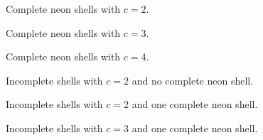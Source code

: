 \begin{figure}[h]
    \centering
    
    \caption{Complete neon shells with $c=2$.}
    \label{compl02}
\end{figure}

\begin{figure}
    \centering
    
    \caption{Complete neon shells with $c=3$.}
    \label{compl03}
\end{figure}

\begin{figure}[h]
    \centering
    
    \caption{Complete neon shells with $c=4$.}
    \label{compl04}
\end{figure}



\begin{figure}[h]
    \centering
    
    \caption{Incomplete shells with $c=2$ and no complete neon shell.}
    \label{incompl00-core02}
\end{figure}


\begin{figure}[h]
    \centering
    
    \caption{Incomplete shells with $c=2$ and one complete neon shell.}
    \label{incompl01-core02}
\end{figure}

\begin{figure}
    \centering
    
    \caption{Incomplete shells with $c=3$ and one complete neon shell.}
    \label{incompl01-core03}
\end{figure}

